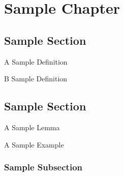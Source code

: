 \setcounter{chapter}{-1}
\chapter{Sample Chapter}
\section{Sample Section}
    \begin{definition}
        \label{sec:0}
        A Sample Definition \newline
        \blindtext
    \end{definition}
    \begin{definition}
        \label{sec:1}
        B Sample Definition \newline
        \blindtext
    \end{definition}
    \section{Sample Section}
    \begin{lemma}
        \label{sec:4}
        A Sample Lemma \newline
        \blindtext
    \end{lemma}
    \begin{eg}
        \label{sec:5}
        A Sample Example \newline
        \blindtext
    \end{eg}
\subsection{Sample Subsection}
    \blindtext